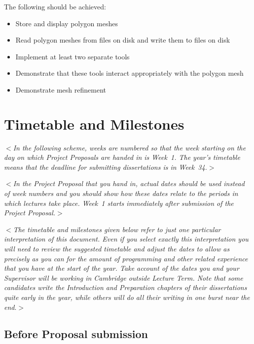 \documentclass[12pt]{article}
\newcommand{\al}{$<$}
\newcommand{\ar}{$>$}
\begin{document}
The following should be achieved:

\begin{itemize}

\item Store and display polygon meshes

\item Read polygon meshes from files on disk and write them to files on disk

\item Implement at least two separate tools

\item Demonstrate that these tools interact appropriately with the polygon
mesh

\item Demonstrate mesh refinement

\end{itemize}

\section*{Timetable and Milestones}

\al\emph{In the following scheme, weeks are numbered so that the week
  starting on the day on which Project Proposals are handed in is
  Week~1.  The year's timetable means that the deadline for submitting
  dissertations is in Week~34.}\ar

\al\emph{In the Project Proposal that you hand in, {\rm actual dates}
  should be used instead of week numbers and you should show how these
  dates relate to the periods in which lectures take place. Week~1
  starts immediately after submission of the Project Proposal.}\ar

\al\emph{The timetable and milestones given below refer to just one
  particular interpretation of this document.  Even if you select
  exactly this interpretation you will need to review the suggested
  timetable and adjust the dates to allow as precisely as you can for
  the amount of programming and other related experience that you have
  at the start of the year.  Take account of the dates you and your
  Supervisor will be working in Cambridge outside Lecture Term.  Note
  that some candidates write the Introduction and Preparation chapters
  of their dissertations quite early in the year, while others will do
  all their writing in one burst near the end}.\ar


\subsection*{Before Proposal submission}
\end{document}
